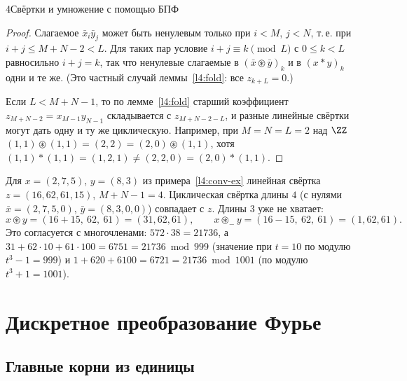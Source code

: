 \begin{lecture}{4}{Свёртки и умножение с помощью БПФ}
\begin{proof}
Слагаемое $\bar x_i \bar y_j$ может быть ненулевым только при $i < M$, $j < N$, т.\,е. при
$i + j \le M + N - 2 < L$. Для таких пар условие $i + j \equiv k \pmod L$ с $0 \le k < L$
равносильно $i + j = k$, так что ненулевые слагаемые в $(\bar x \circledast \bar y)_k$ и
в $(x * y)_k$ одни и те же. (Это частный случай леммы~\ref{l4:fold}: все $z_{k+L} = 0$.)

Если $L < M + N - 1$, то по лемме~\ref{l4:fold} старший коэффициент
$z_{M+N-2} = x_{M-1} y_{N-1}$ складывается с $z_{M+N-2-L}$, и разные линейные свёртки могут дать
одну и ту же циклическую. Например, при $M = N = L = 2$ над $\ZZ$ $(1, 1) \circledast (1, 1) = (2, 2) = (2, 0) \circledast (1, 1)$, хотя
$(1, 1) * (1, 1) = (1, 2, 1) \ne (2, 2, 0) = (2, 0) * (1, 1)$.
\end{proof}

\begin{example}
Для $x = (2, 7, 5)$, $y = (8, 3)$ из примера~\ref{l4:conv-ex} линейная свёртка
$z = (16, 62, 61, 15)$, $M + N - 1 = 4$. Циклическая свёртка длины $4$ (с нулями
$\bar x = (2, 7, 5, 0)$, $\bar y = (8, 3, 0, 0)$) совпадает с $z$. Длины $3$ уже не хватает:
\[
  x \circledast y = (16 + 15,\ 62,\ 61) = (31, 62, 61), \qquad
  x \circledast_{-} y = (16 - 15,\ 62,\ 61) = (1, 62, 61).
\]
Это согласуется с многочленами: $572 \cdot 38 = 21736$, а
$31 + 62 \cdot 10 + 61 \cdot 100 = 6751 = 21736 \bmod 999$ (значение при $t = 10$ по модулю
$t^3 - 1 = 999$) и $1 + 620 + 6100 = 6721 = 21736 \bmod 1001$ (по модулю $t^3 + 1 = 1001$).
\end{example}




\section{Дискретное преобразование Фурье}

\subsection{Главные корни из единицы}


\end{lecture}
